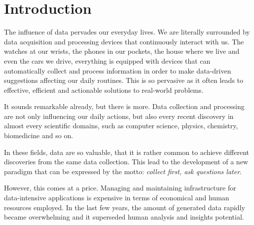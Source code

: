 

\chapter{Introduction} \label{chapter:introduction}


The influence of data pervades our everyday lives. We are literally surrounded by data acquisition and processing devices that continuously interact with us.
The watches at our wrists, the phones in our pockets, the house where we live and even the cars we drive, everything is equipped with devices that can automatically collect and process information in order to make data-driven suggestions affecting our daily routines.
This is so pervasive as it often leads to effective, efficient and actionable solutions to real-world problems.

It sounds remarkable already, but there is more. Data collection and processing are not only influencing our daily actions, but also every recent discovery in almost every scientific domains, such as computer science, physics, chemistry, biomedicine and so on.

In these fields, data are so valuable, that it is rather common to achieve different discoveries from the same data collection. This lead to the development of a new paradigm that can be expressed by the motto: \textit{collect first, ask questions later}.

However, this comes at a price. 
Managing and maintaining infrastructure for data-intensive applications is expensive in terms of economical and human resources employed. In the last few years, the amount of generated data rapidly became overwhelming and it superseded human analysis and insights potential.


